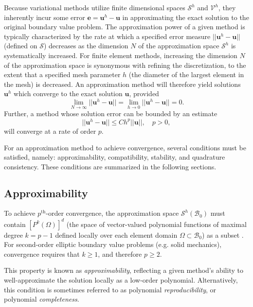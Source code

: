 Because variational methods utilize finite dimensional spaces $\mathcal{S}^h$ and $\mathcal{V}^h$, they inherently incur some error $\bm{e} = \bm{u}^h - \bm{u}$ in approximating the exact solution to the original boundary value problem. The  approximation power of a given method is typically characterized by the rate at which a specified error measure $||\bm{u}^h - \bm{u}||$ (defined on $\mathcal{S}$) decreases as the dimension $N$ of the approximation space $\mathcal{S}^h$ is systematically increased. For finite element methods, increasing the dimension $N$ of the approximation space is synonymous with refining the discretization, to the extent that a specified mesh parameter $h$ (the diameter of the largest element in the mesh) is decreased. An approximation method will therefore yield solutions $\bm{u}^h$ which converge to the exact solution $\bm{u}$, provided
\begin{equation}
	\lim_{N \rightarrow \infty} ||\bm{u}^h - \bm{u}|| = \lim_{h \rightarrow 0} ||\bm{u}^h - \bm{u}|| = 0.
\end{equation}
Further, a method whose solution error can be bounded by an estimate
\begin{equation}
	||\bm{u}^h - \bm{u}|| \leq C h^p ||\bm{u}||, \quad p > 0,
\end{equation}
will converge at a rate of order $p$.

For an approximation method to achieve convergence, several conditions must be satisfied, namely: approximability, compatibility, stability, and quadrature consistency. These conditions are summarized in the following sections.

	\subsection*{Approximability}
	
	To achieve $p^{\text{th}}$-order convergence, the approximation space $\mathcal{S}^h (\mathcal{B}_0)$ must contain $[ P^{k} (\Omega) ]^d$ (the space of vector-valued polynomial functions of maximal degree $k = p-1$ defined locally over each element domain $\Omega \subset \mathcal{B}_0$) as a subset \cite{Hughes:00}. For second-order elliptic boundary value problems (e.g. solid mechanics), convergence requires that $k \geq 1$, and therefore $p \geq 2$.
	
	This property is known as \textit{approximability}, reflecting a given method's ability to well-approximate the solution locally as a low-order polynomial. Alternatively, this condition is sometimes referred to as polynomial \textit{reproducibility}, or polynomial \textit{completeness}.

